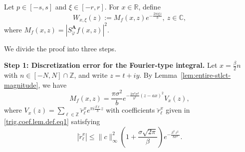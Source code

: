 \documentclass[11pt, reqno]{amsart}
\newcommand{\Z}{\mathbb{Z}}
\newcommand{\R}{\mathbb{R}}
\newcommand{\C}{\mathbb{C}}
\numberwithin{equation}{section}
\begin{document}
\begin{appendices}
Let $p\in[-s,s]$ and $\xi\in[-r,r]$. For $x\in\R$, define
$$W_{x,\xi}(z):=M_f(x,z)e^{-\frac{2\pi i\xi z}{b}},  \ z\in\C,$$
where $M_f(x,z)=|S_{\check{\varphi}}^{\mathbf A}f(x,z)|^2$. 

\smallskip 
We divide the proof into three steps.

\smallskip
\noindent
\textbf{Step 1: Discretization error for the Fourier-type integral.}
Let $x=\frac{\beta}{2}n$ with $n\in[-N,N]\cap\Z$, and write $z=t+iy$. By Lemma~\ref{lem:entire-stlct-magnitude}, we have 
$$M_f(x,z) = \frac{\pi\sigma^2}{b} e^{-\frac{2\pi^2\sigma^2}{b^2}(z-ax)^2} V_x(z), $$
where $V_x(z)=\sum_{\ell\in\Z}\breve r_\ell^x e^{\pi i\frac{\beta\ell}{b}z}$ with coefficients $\breve r_\ell^x$ given in  \eqref{trig.coef.lem.def.eq1} satisfying 
$$ |\breve r_\ell^x| \le \|c\|_\infty^2 \left(1+\frac{\sigma\sqrt{2\pi}}{\beta}\right)e^{-\frac{\beta^2\ell^2}{8\sigma^2}}.$$


\end{appendices}
\end{document}

